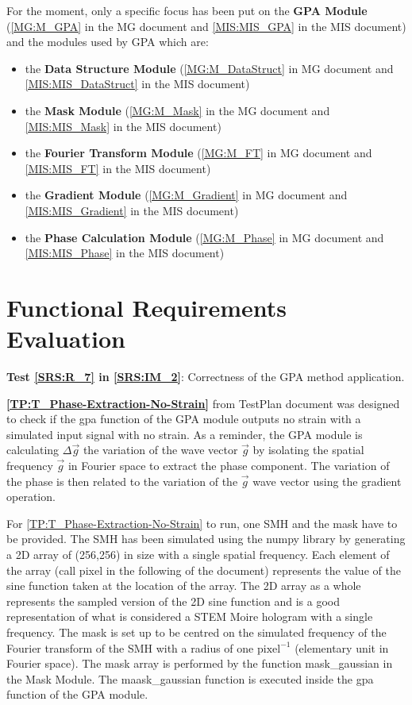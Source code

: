\documentclass[12pt, titlepage]{article}
\begin{document}
For the moment, only a specific focus has been put on the \textbf{GPA Module} (\cref{MG:M_GPA} in the  MG document and \cref{MIS:MIS_GPA} in the MIS document) and the modules used by GPA which are:
\begin{itemize}
\item the \textbf{Data Structure Module} (\cref{MG:M_DataStruct} in MG document and \cref{MIS:MIS_DataStruct} in the MIS document)
\item the \textbf{Mask Module} (\cref{MG:M_Mask} in the MG document and \cref{MIS:MIS_Mask} in the MIS document)
\item the \textbf{Fourier Transform Module} (\cref{MG:M_FT} in MG document and \cref{MIS:MIS_FT} in the MIS document)
\item the \textbf{Gradient Module} (\cref{MG:M_Gradient} in MG document and \cref{MIS:MIS_Gradient} in the MIS document)
\item the \textbf{Phase Calculation Module} (\cref{MG:M_Phase} in MG document and \cref{MIS:MIS_Phase} in the MIS document)
\end{itemize}

\section{Functional Requirements Evaluation}

\textbf{Test \cref{SRS:R_7} in \cref{SRS:IM_2}}: Correctness of the GPA method application.\medskip

\textbf{\cref{TP:T_Phase-Extraction-No-Strain}} from TestPlan document was designed to check if the gpa function of the GPA module outputs no strain with a simulated input signal with no strain. As a reminder, the GPA module is calculating $\Delta \overrightarrow{g}$ the variation of the wave vector $\overrightarrow{g}$ by isolating the spatial frequency $\overrightarrow{g}$ in Fourier space to extract the phase component. The variation of the phase is then related to the variation of the $\overrightarrow{g}$ wave vector using the gradient operation. \medskip

For \cref{TP:T_Phase-Extraction-No-Strain} to run, one SMH and the mask have to be provided. The SMH has been simulated using the numpy library by generating a 2D array of (256,256) in size with a single spatial frequency. Each element of the array (call pixel in the following of the document) represents the value of the sine function taken at the location of the array. The 2D array as a whole represents the sampled version of the 2D sine function and is a good representation of what is considered a STEM Moire hologram with a single frequency. The mask is set up to be centred on the simulated frequency of the Fourier transform of the SMH with a radius of one $\text{pixel}^{-1}$ (elementary unit in Fourier space). The mask array is performed by the function mask{\_}gaussian in the Mask Module. The maask{\_}gaussian function is executed inside the gpa function of the GPA module.
\end{document}
